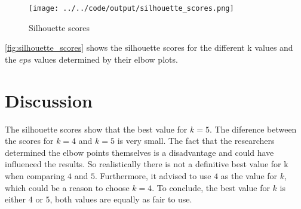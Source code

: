 \documentclass[twoside, a4paper, fleqn, reqno]{article}
\begin{document}
\begin {figure}[H]
	\centering
	\texttt{[image: ../../code/output/silhouette\_scores.png]}
	\caption{Silhouette scores}
	\label{fig:silhouette_scores}
\end {figure}

\autoref{fig:silhouette_scores} shows the silhouette scores for the different k values
and the $eps$ values determined by their elbow plots.

\section{Discussion}

The silhouette scores show that the best value for $k=5$. The diference between the scores for
$k=4$ and $k=5$ is very small.
The fact that the researchers determined the elbow points themselves is a disadvantage
and could have influenced the results.
So realistically there is not a definitive best value for k when comparing $4$ and $5$.
Furthermore, it advised to use $4$ as the value for $k$, which could be a reason to choose $k=4$.
To conclude, the best value for $k$ is either $4$ or $5$, both values are equally as fair to use.
\end{document}
